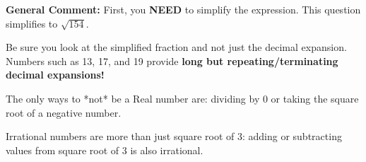 \documentclass{extbook}[14pt]
\begin{document}
\begin{enumerate}
{\textbf{General Comment:} First, you \textbf{NEED} to simplify the expression. This question simplifies to $\sqrt{154}$. 
 
 Be sure you look at the simplified fraction and not just the decimal expansion. Numbers such as 13, 17, and 19 provide \textbf{long but repeating/terminating decimal expansions!} 
 
 The only ways to *not* be a Real number are: dividing by 0 or taking the square root of a negative number. 
 
 Irrational numbers are more than just square root of 3: adding or subtracting values from square root of 3 is also irrational.
}
\end{enumerate}
\end{document}
